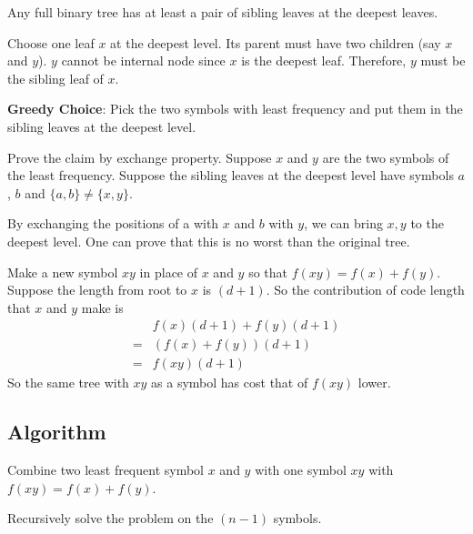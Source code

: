 \begin{claim}
	Any full binary tree has at least a pair of sibling leaves at the deepest leaves.
\end{claim}

\begin{claimproof}
	Choose one leaf $x$ at the deepest level. Its parent must have two children (say $x$ and $y$). $y$ cannot be internal node since $x$ is the deepest leaf. Therefore, $y$ must be the sibling leaf of $x$.
\end{claimproof}

\begin{claim}
	\textbf{Greedy Choice}: Pick the two symbols with least frequency and put them in the sibling leaves at the deepest level.
\end{claim}

\begin{claimproof}
	Prove the claim by exchange property. Suppose $x$ and $y$ are the two symbols of the least frequency. Suppose the sibling leaves at the deepest level have symbols $a$, $b$ and $\{a, b\} \neq \{x, y\}$.
	
	By exchanging the positions of a with $ x $ and $ b $ with $ y $, we can bring $ x, y $ to the deepest level. One can prove that this is no worst than the original tree.
	
\end{claimproof}

Make a new symbol $ xy $ in place of $ x $ and $ y $ so that $ f(xy) = f(x) + f(y) $. Suppose the length from root to $x$ is $ (d + 1) $. So the contribution of code length that $x$ and $y$ make is
\begin{align*}
& f(x) (d+1) + f(y)(d+1)\\
=& (f(x) + f(y))(d+1)\\
=& f(xy)(d+1)
\end{align*}
So the same tree with $xy$ as a symbol has cost that of $ f(xy) $ lower.

\subsection{Algorithm}
Combine two least frequent symbol $ x $ and $ y $ with one symbol $ xy $ with $ f(xy) = f(x) + f(y) $. 

Recursively solve the problem on the $ (n-1) $ symbols.